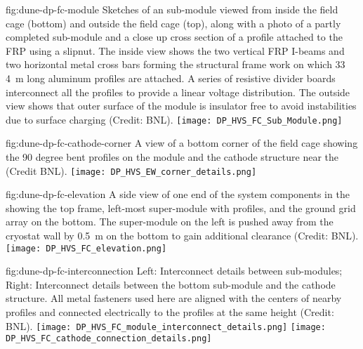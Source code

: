 \begin{dunefigure}{fig:dune-dp-fc-module}
{Sketches of an  sub-module viewed from inside the field cage (bottom) and outside the field cage (top), along with a photo of a partly completed sub-module and a close up cross section of a profile attached to the FRP using a slipnut.  The inside view shows the two vertical FRP I-beams and two horizontal metal cross bars forming the structural frame work on which \num{33} \SI{4}{\m} long aluminum profiles are attached.  A series of resistive divider boards interconnect all the profiles to provide a linear voltage distribution. The outside view shows that outer surface of the  module is insulator free to avoid  instabilities due to surface charging (Credit: BNL).
}
\texttt{[image: DP\_HVS\_FC\_Sub\_Module.png]}
\end{dunefigure}

\begin{dunefigure}{fig:dune-dp-fc-cathode-corner}
{A view of a bottom corner of the field cage showing the \num{90} degree bent  profiles on the \endwall module and the cathode structure near the \endwall (Credit BNL).}
\texttt{[image: DP\_HVS\_EW\_corner\_details.png]}
\end{dunefigure}

\begin{dunefigure}{fig:dune-dp-fc-elevation}
{A side view of one end of the  system components in the  showing the top frame, left-most super-module with profiles, and the ground grid array on the bottom.  The \endwall super-module on the left is pushed away from the cryostat wall by \SI{0.5}{\m} on the bottom to gain additional  clearance (Credit: BNL).}
\texttt{[image: DP\_HVS\_FC\_elevation.png]}
\end{dunefigure}


\begin{dunefigure}{fig:dune-dp-fc-interconnection}
{Left: Interconnect details between  sub-modules; Right: Interconnect details between the bottom  sub-module and the cathode structure. All metal fasteners used here are aligned with the centers of nearby  profiles and connected electrically to the  profiles at the same height (Credit: BNL). }
\texttt{[image: DP\_HVS\_FC\_module\_interconnect\_details.png]}
\texttt{[image: DP\_HVS\_FC\_cathode\_connection\_details.png]}
\end{dunefigure}


